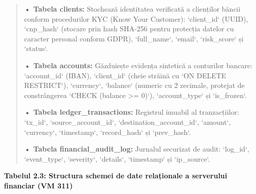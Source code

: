 \documentclass[
]{article}
\begin{document}
\begin{quote}
\textbf{• Tabela clients:} Stochează identitatea verificată a clienților
băncii conform procedurilor KYC (Know Your Customer): `client\_id`
(UUID), `cnp\_hash` (stocare prin hash SHA-256 pentru protecția datelor
cu caracter personal conform GDPR), `full\_name`, `email`, `risk\_score`
și `status`.

\textbf{• Tabela accounts:} Găzduiește evidența sintetică a conturilor
bancare: `account\_id` (IBAN), `client\_id` (cheie străină cu `ON DELETE
RESTRICT`), `currency`, `balance` (numeric cu 2 zecimale, protejat de
constrângerea `CHECK (balance \textgreater= 0)`), `account\_type` și
`is\_frozen`.

\textbf{• Tabela ledger\_transactions:} Registrul imuabil al
tranzacțiilor: `tx\_id`, `source\_account\_id`,
`destination\_account\_id`, `amount`, `currency`, `timestamp`,
`record\_hash` și `prev\_hash`.

\textbf{• Tabela financial\_audit\_log:} Jurnalul securizat de audit:
`log\_id`, `event\_type`, `severity`, `details`, `timestamp` și
`ip\_source`.
\end{quote}

\textbf{Tabelul 2.3: Structura schemei de date relaționale a serverului
financiar (VM 311)}
\end{document}
